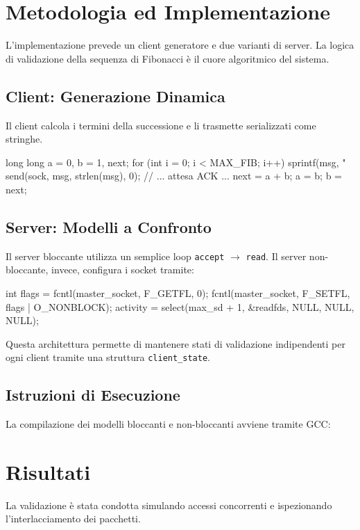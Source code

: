\documentclass[a4paper,12pt]{article}
\begin{document}
\section{Metodologia ed Implementazione}
L'implementazione prevede un client generatore e due varianti di server. La logica di validazione della sequenza di Fibonacci è il cuore algoritmico del sistema.

\subsection{Client: Generazione Dinamica}
Il client calcola i termini della successione e li trasmette serializzati come stringhe.
\begin{ccode}
long long a = 0, b = 1, next;
for (int i = 0; i < MAX_FIB; i++) {
    sprintf(msg, "%
    send(sock, msg, strlen(msg), 0);
    // ... attesa ACK ...
    next = a + b; a = b; b = next;
}
\end{ccode}

\subsection{Server: Modelli a Confronto}
Il server bloccante utilizza un semplice loop \texttt{accept} $\rightarrow$ \texttt{read}. Il server non-bloccante, invece, configura i socket tramite:
\begin{ccode}
int flags = fcntl(master_socket, F_GETFL, 0);
fcntl(master_socket, F_SETFL, flags | O_NONBLOCK);
activity = select(max_sd + 1, &readfds, NULL, NULL, NULL);
\end{ccode}
Questa architettura permette di mantenere stati di validazione indipendenti per ogni client tramite una struttura \texttt{client\_state}.


\subsection{Istruzioni di Esecuzione}
La compilazione dei modelli bloccanti e non-bloccanti avviene tramite GCC:

\section{Risultati}
La validazione è stata condotta simulando accessi concorrenti e ispezionando l'interlacciamento dei pacchetti.
\end{document}
